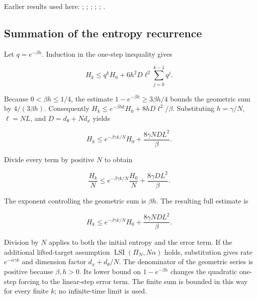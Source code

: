 \documentclass[11pt,a4paper]{report}
\begin{document}
Earlier results used here: \cite[Section~3.1.3]{LangevinLean2026ULALSI}; \cite[Section~3.34.1]{LangevinLean2026ULALSI}; \cite[Section~3.1.1]{LangevinLean2026IPLA}; \cite[Section~3.1.3]{LangevinLean2026IPLA}; \cite[Section~3.1.4]{LangevinLean2026IPLA}; \cite[Section~3.3.2]{LangevinLean2026IPLA}.
\subsection{\texorpdfstring{Summation of the entropy recurrence}{Summation of the entropy recurrence}}
\label{report-step-IPLA-LSI-Theorem-lean-4}


Let \(q=e^{-\beta h}\). Induction in the one-step inequality gives

\[H_k\le q^kH_0+6h^2D\ell^2\sum_{j=0}^{k-1}q^j.\]

Because \(0<\beta h\le1/4\), the estimate \(1-e^{-\beta h}\ge3\beta h/4\) bounds the geometric sum by \(4/(3\beta h)\). Consequently \(H_k\le e^{-\beta hk}H_0+8hD\ell^2/\beta\). Substituting \(h=\gamma/N\), \(\ell=NL\), and \(D=d_\theta+Nd_x\) yields

\[H_k\le e^{-\beta\gamma k/N}H_0+\frac{8\gamma ND L^2}{\beta}.\]

Divide every term by positive \(N\) to obtain

\[\frac{H_k}{N}\le e^{-\beta\gamma k/N}\frac{H_0}{N}+\frac{8\gamma DL^2}{\beta}.\]

The exponent controlling the geometric sum is \(\beta h\). The resulting full estimate is

\[H_k\le e^{-\beta\gamma k/N}H_0+\frac{8\gamma NDL^2}{\beta}.\]

Division by \(N\) applies to both the initial entropy and the error term. If the additional lifted-target assumption \(\operatorname{LSI}(\Pi_N,N\alpha)\) holds, substitution gives rate \(e^{-\alpha\gamma k}\) and dimension factor \(d_x+d_\theta/N\). The denominator of the geometric series is positive because \(\beta,h>0\). Its lower bound on \(1-e^{-\beta h}\) changes the quadratic one-step forcing to the linear-step error term. The finite sum is bounded in this way for every finite \(k\); no infinite-time limit is used.
\end{document}
